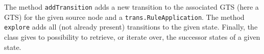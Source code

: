 The method {\tt addTransition} adds a new transition to the associated GTS
(here a GTS) for the given source node and a {\tt trans.RuleApplication}.
The method {\tt explore} adds all (not already present) transitions to the
given state. Finally, the class gives to possibility to retrieve, or
iterate over, the successor states of a given state. 










